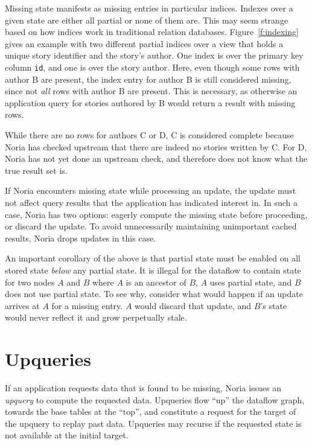 Missing state manifests as missing entries in particular indices. Indexes over a
given state are either all partial or none of them are. This may seem strange
based on how indices work in traditional relation databases.
Figure~\vref{f:indexing} gives an example with two different partial indices
over a view that holds a unique story identifier and the story's author. One
index is over the primary key column \texttt{id}, and one is over the story
author. Here, even though some rows with author B are present, the index entry
for author B is still considered missing, since not \emph{all} rows with author
B are present. This is necessary, as otherwise an application query for stories
authored by B would return a result with missing rows.

While there are no rows for authors C or D, C is considered complete because
Noria has checked upstream that there are indeed no stories written by C. For D,
Noria has not yet done an upstream check, and therefore does not know what the
true result set is.

If Noria encounters missing state while processing an update, the update must
not affect query results that the application has indicated interest in. In such
a case, Noria has two options: eagerly compute the missing state before
proceeding, or discard the update. To avoid unnecessarily maintaining
unimportant cached results, Noria drops updates in this case.

An important corollary of the above is that partial state must be enabled
on all stored state \emph{below} any partial state. It is illegal for the
dataflow to contain state for two nodes $A$ and $B$ where $A$ is an ancestor of
$B$, $A$ uses partial state, and $B$ does not use partial state. To see why,
consider what would happen if an update arrives at $A$ for a missing entry. $A$
would discard that update, and $B$'s state would never reflect it and grow
perpetually stale.

\section{Upqueries}
\label{s:upqueries}

If an application requests data that is found to be missing, Noria issues an
\textit{upquery} to compute the requested data. Upqueries flow ``up'' the
dataflow graph, towards the base tables at the ``top'', and constitute a request
for the target of the upquery to replay past data. Upqueries may recurse if the
requested state is not available at the initial target.

